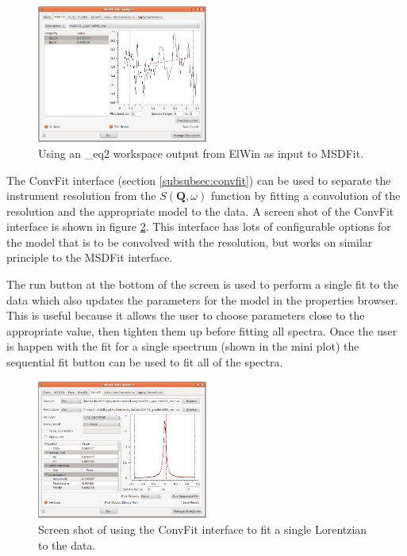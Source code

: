 \documentclass[paper=a4, fontsize=11pt]{scrartcl}	%
\numberwithin{equation}{section}															%
\numberwithin{figure}{section}																%
\numberwithin{table}{section}																%
\begin{document}
\begin{figure}[H]
\centering
\includegraphics[width=0.5\textwidth]{img/iris-ida-msd.png}
\caption{Using an \*\_eq2 workspace output from ElWin as input to MSDFit.}
\label{fig:iris-ida-msd}
\end{figure}

The ConvFit interface (section \ref{subsubsec:convfit}) can be used to separate the instrument resolution from the $S(\mathbf{Q}, \omega)$ function by fitting a convolution of the resolution and the appropriate model to the data. A screen shot of the ConvFit interface is shown in figure \ref{fig:iris-ida-convfit}. This interface has lots of configurable options for the model that is to be convolved with the resolution, but works on similar principle to the MSDFit interface. 

The run button at the bottom of the screen is used to perform a single fit to the data which also updates the parameters for the model in the properties browser. This is useful because it allows the user to choose parameters close to the appropriate value, then tighten them up before fitting all spectra. Once the user is happen with the fit for a single spectrum (shown in the mini plot) the sequential fit button can be used to fit all of the spectra.

\begin{figure}[H]
\centering
\includegraphics[width=0.5\textwidth]{img/iris-ida-convfit.png}
\caption{Screen shot of using the ConvFit interface to fit a single Lorentzian to the data.}
\label{fig:iris-ida-convfit}
\end{figure}
\end{document}
